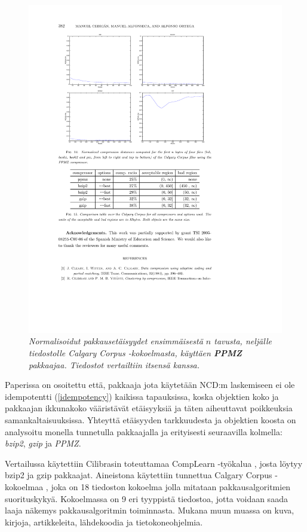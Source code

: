 \documentclass[12pt,finnish]{tktltiki2}
\theoremstyle{definition}
\theoremstyle{remark}
\begin{document}
    \begin{figure}[tb]
        \immediate{}
      \includegraphics{img/ppmz}
      \caption{\emph{Normalisoidut pakkausetäisyydet ensimmäisestä $n$ tavusta, neljälle tiedostolle Calgary Corpus -kokoelmasta, käyttäen \textbf{PPMZ} pakkaajaa. Tiedostot vertailtiin itsensä kanssa.} \cite{cebrian2005common}}
      \label{fig:ppmz}
    \end{figure}

      Paperissa \cite{cebrian2005common} on osoitettu että, pakkaaja jota käytetään NCD:m laskemiseen ei ole idempotentti (\ref{idempotency}) kaikissa tapauksissa, koska objektien koko ja pakkaajan ikkunakoko vääristävät etäisyyksiä ja täten aiheuttavat poikkeuksia samankaltaisuuksissa. Yhteyttä etäisyyden tarkkuudesta ja objektien koosta on analysoitu monella tunnetulla pakkaajalla ja erityisesti seuraavilla kolmella:  \emph{bzip2}, \emph{gzip} ja \emph{PPMZ}.

      Vertailussa käytettiin Cilibrasin toteuttamaa CompLearn -työkalua \cite{complearn}, josta löytyy bzip2 ja gzip pakkaajat.
      Aineistona käytettiin tunnettua Calgary Corpus -kokoelmaa \cite{calgarycorpus}, joka on 18 tiedoston kokoelma jolla mitataan pakkausalgoritmien suorituskykyä.
      Kokoelmassa on 9 eri tyyppistä tiedostoa, jotta voidaan saada laaja näkemys pakkausalgoritmin toiminnasta.
      Mukana muun muassa on kuva, kirjoja, artikkeleita, lähdekoodia ja tietokoneohjelmia.
\end{document}
